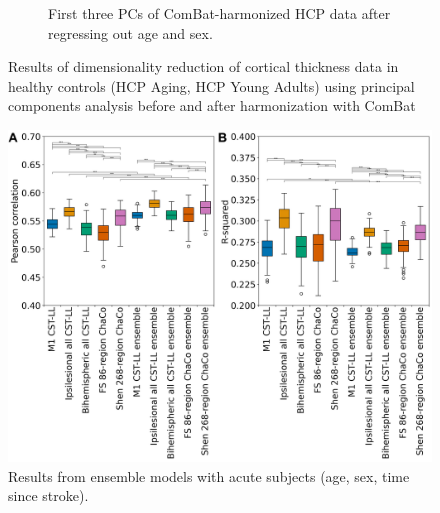 \documentclass[10pt]{article}
\begin{document}
\begin{figure}
\begin{subfigure}{1\textwidth}
  \caption{First three PCs of ComBat-harmonized HCP data after regressing out age and sex.}
  \label{fig:sfig2}
\end{subfigure}
\caption{Results of dimensionality reduction of cortical thickness data in healthy controls (HCP Aging, HCP Young Adults) using principal components analysis before and after harmonization with ComBat}
\label{fig:fig}
\end{figure}



\begin{figure}[ht]
\centering
\includegraphics[width=1\linewidth]{figures/Analysis7.png}
\caption{Results from ensemble models with acute subjects (age, sex, time since stroke).}
\label{smatt_pairwise_correlations}
\end{figure}
\end{document}
